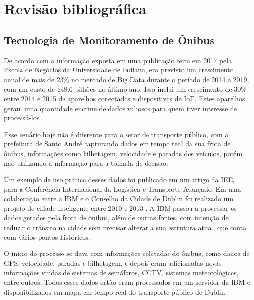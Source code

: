 \chapter{Revisão bibliográfica}
\label{Cap:RevisaoBibliografica}
\newcommand{\WidthAlgumaCoisa}{6.5 cm}

\section{Tecnologia de Monitoramento de Ônibus}

\indent
\par De acordo com a informação exposta em uma publicação feita em 2017 pela Escola de Negócios da Universidade de Indiana, era previsto um crescimento anual de mais de 23\% no mercado de Big Data durante o período de 2014 a 2019, com um custo de \$48,6 bilhões no último ano. Isso inclui um crescimento de 30\% entre 2014 e 2015 de aparelhos conectados e dispositivos de IoT. Estes aparelhos geram uma quantidade enorme de dados valiosos para quem tiver interesse de processá-los \cite{Lee2017}.

\par Esse cenário hoje não é diferente para o setor de transporte público, com a prefeitura de Santo André capturando dados em tempo real da sua frota de ônibus, informações como bilhetagem, velocidade e paradas dos veículos, porém não utilizando a informação para a tomada de decisão.

\par Um exemplo de uso prático desses dados foi publicado em um artigo da IEE, para a Conferência Internacional da Logística e Transporte Avançado. Em uma colaboração entre a IBM e o Conselho da Cidade de Dublin foi realizado um projeto de cidade inteligente entre 2010 e 2013 \cite{BenAyed2015}. A IBM passou a processar os dados gerados pela frota de ônibus, além de outras fontes, com intenção de reduzir o trânsito na cidade sem precisar alterar a sua estrutura atual, que conta com vários pontos históricos.

\par O inicio do processo se dava com informações coletadas do ônibus, como dados de GPS, velocidade, paradas e bilhetagem, e depois eram adicionadas novas informações vindas de sistemas de semáforos, CCTV, sistemas meteorológicos, entre outros. Todos esses dados então eram processados em um servidor da IBM e disponibilizados em mapa em tempo real do transporte público de Dublin.

